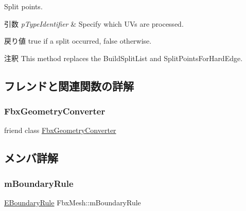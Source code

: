 Split points. 
\begin{DoxyParams}{引数}
{\em p\+Type\+Identifier} & Specify which U\+Vs are processed. \\
\hline
\end{DoxyParams}
\begin{DoxyReturn}{戻り値}
{\ttfamily true} if a split occurred, false otherwise. 
\end{DoxyReturn}
\begin{DoxyRemark}{注釈}
This method replaces the Build\+Split\+List and Split\+Points\+For\+Hard\+Edge. 
\end{DoxyRemark}


\subsection{フレンドと関連関数の詳解}
\mbox{\label{class_fbx_mesh_a2c65afd59c2bab21d92824fbe4422545}} 
\subsubsection{\texorpdfstring{Fbx\+Geometry\+Converter}{FbxGeometryConverter}}
{\footnotesize\ttfamily friend class \hyperlink{class_fbx_geometry_converter}{Fbx\+Geometry\+Converter}\hspace{0.3cm}{\ttfamily [friend]}}



\subsection{メンバ詳解}
\mbox{\label{class_fbx_mesh_a18ab74b81af5df2f4e1b4a02c84f56b8}} 
\subsubsection{\texorpdfstring{m\+Boundary\+Rule}{mBoundaryRule}}
{\footnotesize\ttfamily \hyperlink{class_fbx_mesh_ab9e7d41ffcd49467a374c72e0d6f3561}{E\+Boundary\+Rule} Fbx\+Mesh\+::m\+Boundary\+Rule\hspace{0.3cm}{\ttfamily [protected]}}

\mbox{\label{class_fbx_mesh_ae9005285762c3272f560c2f63a398cd4}} 
